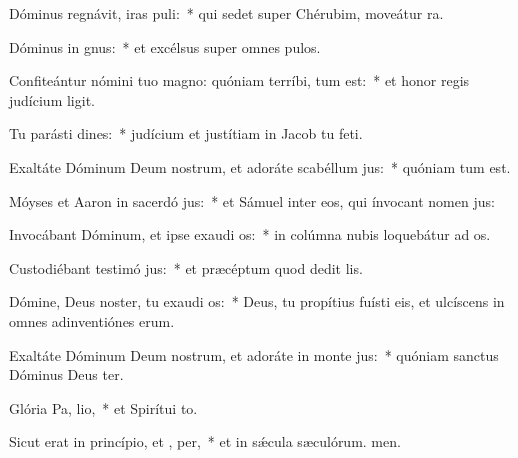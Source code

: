 \item Dóminus regnávit, iras puli:~* qui sedet super Chérubim, moveátur ra.
\item Dóminus in  gnus:~* et excélsus super omnes pulos.
\item Confiteántur nómini tuo magno: quóniam terríbi,  tum est:~* et honor regis judícium ligit.
\item Tu parásti dines:~* judícium et justítiam in Jacob tu feti.
\item Exaltáte Dóminum Deum nostrum, et adoráte scabéllum  jus:~* quóniam tum est.
\item Móyses et Aaron in sacerdó jus:~* et Sámuel inter eos, qui ínvocant nomen jus:
\item Invocábant Dóminum, et ipse exaudi os:~* in colúmna nubis loquebátur ad os.
\item Custodiébant testimó jus:~* et præcéptum quod dedit lis.
\item Dómine, Deus noster, tu exaudi os:~* Deus, tu propítius fuísti eis, et ulcíscens in omnes adinventiónes erum.
\item Exaltáte Dóminum Deum nostrum, et adoráte in monte  jus:~* quóniam sanctus Dóminus Deus ter.
\item Glória Pa,  lio,~* et Spirítui to.
\item Sicut erat in princípio, et ,  per,~* et in sǽcula sæculórum. men.
